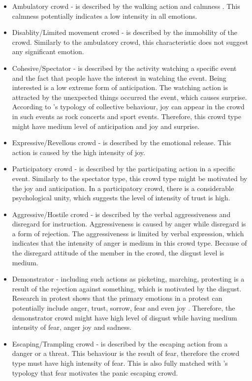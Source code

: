 \begin{itemize}
\item Ambulatory crowd - is described by the walking action and calmness \citep{Zeitz2009}. This calmness potentially indicates a low intensity in all emotions.
\item Disablity/Limited movement crowd - is described by the immobility of the crowd. Similarly to the ambulatory crowd, this characteristic does not suggest any significant emotion.	
\item Cohesive/Spectator - is described by the activity watching a specific event and the fact that people have the interest in watching the event. Being interested is a low extreme form of anticipation. The watching action is attracted by the unexpected things occurred the event, which causes surprise. According to \citet{Lofland1985}'s typology of collective behaviour, joy can appear in the crowd in such events as rock concerts and sport events. Therefore, this crowd type might have medium level of anticipation and joy and surprise.
\item Expressive/Revellous crowd - is described by the emotional release. This action is caused by the high intensity of joy.
\item Participatory crowd - is described by the participating action in a specific event. Similarly to the spectator type, this crowd type might be motivated by the joy and anticipation. In a participatory crowd, there is a considerable psychological unity, which suggests the level of intensity of trust is high.
\item Aggressive/Hostile crowd - is described by the verbal aggressiveness and disregard for instruction. Aggressiveness is caused by anger while disregard is a form of rejection. The aggressiveness is limited by verbal expression, which indicates that the intensity of anger is medium in this crowd type. Because of the disregard attitude of the member in the crowd, the disgust level is medium.
\item Demonstrator - including such actions as picketing, marching, protesting is a result of the rejection against something, which is motivated by the disgust. Research in protest shows that the primary emotions in a protest can potentially include anger, trust, sorrow, fear and even joy \citep{jasper1998emotions}. Therefore, the demonstrator crowd might have high level of disgust while having medium intensity of fear, anger joy and sadness.
\item Escaping/Trampling crowd - is described by the escaping action from a danger or a threat. This behaviour is the result of fear, therefore the crowd type must have high intensity of fear. This is also fully matched with \citet{Lofland1985}'s typology that fear motivates the panic escaping crowd.

\end{itemize}

